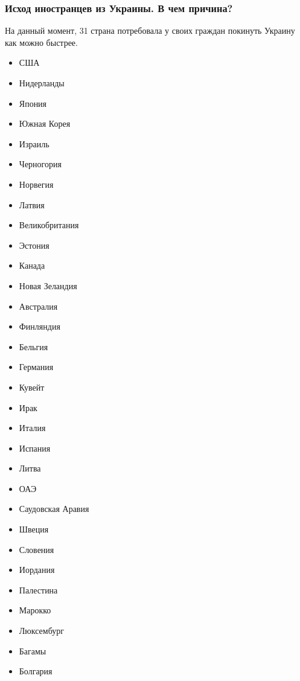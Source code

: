  
 
 
 
 

\subsubsection{Исход иностранцев из Украины. В чем причина?}
\label{sec:13_02_2022.stz.news.ua.strana.1.vozduh_blokada.1.ishod_inostrancev}

На данный момент, 31 страна потребовала у своих граждан покинуть Украину как
можно быстрее. 

\begin{itemize}
\item США
\item Нидерланды
\item Япония
\item Южная Корея
\item Израиль
\item Черногория
\item Норвегия
\item Латвия
\item Великобритания
\item Эстония
\item Канада
\item Новая Зеландия
\item Австралия
\item Финляндия
\item Бельгия
\item Германия
\item Кувейт
\item Ирак
\item Италия
\item Испания
\item Литва
\item ОАЭ
\item Саудовская Аравия
\item Швеция
\item Словения
\item Иордания
\item Палестина
\item Марокко
\item Люксембург
\item Багамы
\item Болгария
\end{itemize}

